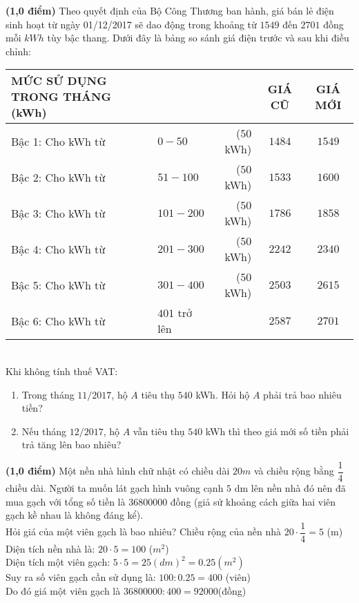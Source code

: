\begin{ex}[6D1T6]
	\textbf{(1,0 điểm)} 
	Theo quyết định của Bộ Công Thương ban hành, giá bán lẻ điện sinh hoạt từ ngày 01/12/2017 sẽ dao động
	trong khoảng từ $1549$ đến $2701$ đồng mỗi $kWh$ tùy bậc thang.
	Dưới đây là bảng so sánh giá điện trước và sau khi điều chỉnh:\\
	 \begin{tabular}{|llr|c|c|}
	 \hline
	 \textbf{MỨC SỬ DỤNG TRONG THÁNG (kWh)}&\quad&\quad&\textbf{GIÁ CŨ}&\textbf{GIÁ MỚI}\\
	 \hline
	 Bậc 1: Cho kWh từ & $0-50$ &($50$kWh)&$1484$&$1549$\\
	 \hline
	 Bậc 2: Cho kWh từ & $51-100$ &($50$kWh)&$1533$&$1600$\\
	 \hline
	 Bậc 3: Cho kWh từ & $101-200$ &($50$kWh)&$1786$&$1858$\\
	 \hline
	 Bậc 4: Cho kWh từ & $201-300$& ($50$kWh)&$2242$&$2340$\\
	 \hline
	 Bậc 5: Cho kWh từ & $301-400$ &($50$kWh)&$2503$&$2615$\\
	 \hline
	 Bậc 6: Cho kWh từ & $401$ trở lên &\quad                &$2587$&$2701$\\
	 \hline
	 \end{tabular}\\
	 Khi không tính thuế VAT:
	 \begin{enumerate}
	 \item Trong tháng $11/2017$, hộ $A$ tiêu thụ $540$ kWh. Hỏi hộ $A$ phải trả bao nhiêu tiền?
	 \item Nếu tháng $12/2017$, hộ $A$ vẫn tiêu thụ $540$ kWh thì theo giá mới số tiền phải trả 
	 tăng lên bao nhiêu?
	 \end{enumerate}
\end{ex}
\begin{ex}%
	\textbf{(1,0 điểm)}
	Một nền nhà hình chữ nhật có chiều dài $20m$ và chiều rộng bằng $\dfrac{1}{4}$ chiều dài. Người ta muốn lát
	gạch hình vuông cạnh $5$ dm lên nền nhà đó nên đã mua gạch với tổng số tiền là $36800000$ đồng (giả sử
	khoảng cách giữa hai viên gạch kề nhau là không đáng kể).\\
	Hỏi giá của một viên gạch là bao nhiêu?
	\loigiai
	{
	Chiều rộng của nền nhà $20 \cdot \dfrac{1}{4}=5$ (m)\\
	Diện tích nền nhà là: $20 \cdot 5=100$ ($m^2$)\\
	Diện tích một viên gạch: $5 \cdot 5=25 (dm)^2=0.25 (m^2)$\\
	Suy ra số viên gạch cần sử dụng là: $100:0.25=400$ (viên)\\
	Do đó giá một viên gạch là $36800000:400=92000$(đồng)
	}
\end{ex}
